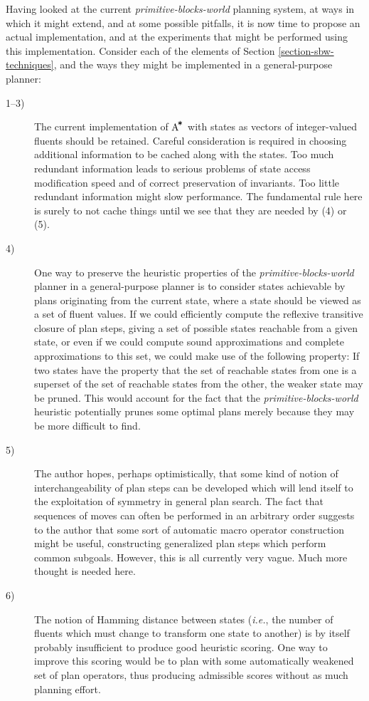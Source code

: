 \documentclass{article}
\newcommand{\sbw}{{\em primitive-blocks-world}}
\newcommand{\astar}{{$\mbox{A}^{\!\mbox{\tt *}}$}}
\begin{document}
Having looked at the current \sbw{} planning system, at ways
in which it might extend, and at some possible pitfalls, it is
now time to propose an actual implementation, and at the
experiments that might be performed using this implementation.
Consider each of the elements of Section \ref{section-sbw-techniques},
and the ways they might be implemented in a general-purpose planner:
\begin{description}
\item[1--3)]
The current implementation of \astar{} with states as vectors
of integer-valued fluents should be retained.  Careful consideration
is required in choosing additional information to be cached
along with the states.  Too much redundant information leads to
serious problems of state access modification speed and of correct preservation of
invariants.  Too little redundant information might slow performance.
The fundamental rule here is surely to not cache things until we see
that they are needed by (4) or (5).

\item[4)]
One way to preserve the heuristic properties of the \sbw{} planner
in a general-purpose planner is to consider states achievable
by plans originating from the current state, where a state should
be viewed as a set of fluent values.
If we could efficiently compute the reflexive transitive closure of
plan steps, giving a set of
possible states reachable from a given state, or even if we could
compute 
sound approximations and complete approximations to this set,
we could make use of the following
property:  If two states have the
property that the set of reachable states from one
is a superset of the set of reachable states from the
other, the weaker state may be pruned.
This would account for the fact that the \sbw{} heuristic
potentially prunes some optimal plans merely because they
may be more difficult to find.

\item[5)]
The author hopes, perhaps optimistically, that some kind
of notion of interchangeability of plan steps can be
developed which will lend itself to the exploitation
of symmetry in general plan search.  The
fact that sequences of moves can often be performed in an arbitrary order
suggests to the author that some sort of automatic macro operator
construction might be useful, constructing generalized plan steps which
perform common subgoals.  However, this is all currently very vague.
Much more thought is needed here.

\item[6)]
The notion of Hamming distance between states ({\em i.e.},
the number of fluents which must change to transform one
state to another) is by itself probably insufficient to produce
good heuristic scoring.  One way to improve this scoring would
be to plan with some automatically weakened set of plan operators,
thus producing admissible scores without as much planning effort.


\end{description}
\end{document}
